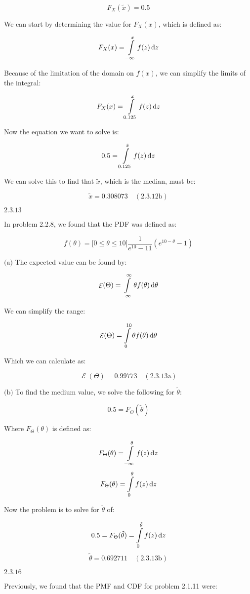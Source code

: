 \documentclass{article}
\newcommand{\problem}[2]{$\boxed{\text{#1.#2}}$}
\newcommand{\subproblem}[3]{$\boxed{\text{(#3)}}$}
\newcommand{\subsolution}[4]{\boxed{#4\quad(\text{#1.#2#3})}}
\renewcommand{\d}[1]{\,\textnormal{d}#1}
\DeclareMathOperator{\E}{\mathcal{E}}
\begin{document}
\[
F_X(\tilde{x})=0.5
\]

We can start by determining the value for $F_X(x)$, which is defined
as:

\[
F_X(x)=\int\limits_{-\infty}^x f(z)\d{z}
\]

Because of the limitation of the domain on $f(x)$, we can simplify the
limits of the integral:

\[
F_X(x)=\int\limits_{0.125}^x f(z)\d{z}
\]

Now the equation we want to solve is:

\[
0.5=\int\limits_{0.125}^{\tilde{x}} f(z)\d{z}
\]

We can solve this to find that $\tilde{x}$, which is the median, must
be:

\[
\subsolution{2.3}{12}{b}{\tilde{x}=0.308073}
\]

%
\problem{2.3}{13}

In problem 2.2.8, we found that the PDF was defined as:

\[
f(\theta)=\lbrack0\le\theta\le10\rbrack \frac{1}{e^{10}-11}\left(e^{10-\theta}-1\right)
\]

%
\subproblem{2.3}{13}{a} The expected value can be found by:

\[
\E(\Theta)=\int\limits_{-\infty}^\infty \theta f(\theta)\d{\theta}
\]

We can simplify the range:

\[
\E(\Theta)=\int\limits_{0}^{10} \theta f(\theta)\d{\theta}
\]

Which we can calculate as:

\[
\subsolution{2.3}{13}{a}{\E(\Theta)=0.99773}
\]

%
\subproblem{2.3}{13}{b} To find the medium value, we solve the
following for $\tilde{\theta}$:

\[
0.5=F_\Theta(\tilde{\theta})
\]

Where $F_\Theta(\theta)$ is defined as:

\[
F_\Theta(\theta)=\int\limits_{-\infty}^\theta f(z)\d{z}
\] \[
F_\Theta(\theta)=\int\limits_{0}^\theta f(z)\d{z}
\]

Now the problem is to solve for $\tilde{\theta}$ of:

\[
0.5=F_\Theta(\tilde{\theta})=\int\limits_{0}^{\tilde{\theta}} f(z)\d{z}
\] \[
\subsolution{2.3}{13}{b}{\tilde{\theta}=0.692711}
\]

%
\problem{2.3}{16}

Previously, we found that the PMF and CDF for problem 2.1.11 were:
\end{document}
